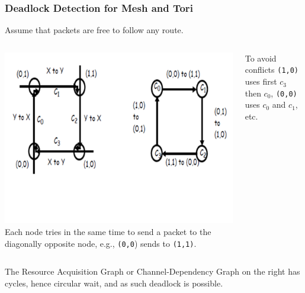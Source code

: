 \documentclass{beamer}
\newcommand{\emp}[1]{\textcolor{DikuRed}{ #1}}
\begin{document}
\begin{frame}[fragile,t]
\frametitle{Deadlock Detection for Mesh and Tori}

\alert{Assume that packets are free to follow any route.}
\medskip

\begin{columns}
\includegraphics[width=44ex]{FigsInterconnect/DeadlockAvoid1}
Each node tries in the same time to send 
a packet to the diagonally opposite node, 
e.g., {\tt(0,0}) sends to {\tt(1,1)}.
\medskip

To avoid conflicts {\tt(1,0)} uses first $c_3$ then $c_0$, 
{\tt(0,0)} uses $c_0$ and $c_1$, etc.\\{\tt~~}\\{\tt~~}\\{\tt~~}
\end{columns}
\vspace{-5ex}

The Resource Acquisition Graph or \emp{Channel-Dependency Graph}
on the right \alert{has cycles}, hence circular wait, and as such 
\alert{deadlock is possible}.

\end{frame}
\end{document}
